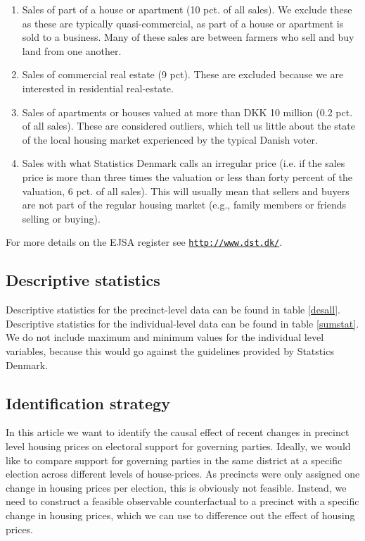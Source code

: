 \documentclass[12pt,a4paper]{article}
\begin{document}
	\begin{enumerate}
		\item Sales of part of a house or apartment (10 pct. of all sales). We exclude these as these are typically quasi-commercial, as part of a house or apartment is sold to a business. Many of these sales are between farmers who sell and buy land from one another.
		\item Sales of commercial real estate (9 pct). These are excluded because we are interested in residential real-estate.
		\item Sales of apartments or houses valued at more than DKK 10 million (0.2 pct. of all sales). These are considered outliers, which tell us little about the state of the local housing market experienced by the typical Danish voter.
		\item Sales with what Statistics Denmark calls an irregular price (i.e. if the sales price is more than three times the valuation or less than forty percent of the valuation, 6 pct. of all sales). This will usually mean that sellers and buyers are not part of the regular housing market (e.g., family members or friends selling or buying).
	\end{enumerate}
	
	For more details on the EJSA register see \texttt{\href{http://www.dst.dk/extranet/ForskningVariabellister/EJSA\%20-\%20Ejendomme\%20salgsoplysninger.html}{http://www.dst.dk/}}.

	\newpage		
			\subsection{Descriptive statistics}
			\setcounter{table}{0}
			
			Descriptive statistics for the precinct-level data can be found in table \ref{desall}. Descriptive statistics for the individual-level data can be found in table \ref{sumstat}. We do not include maximum and minimum values for the individual level variables, because this would go against the guidelines provided by Statstics Denmark.
			
			
			
			
			
			\newpage
			
			\subsection{Identification strategy}
			
			In this article we want to identify the causal effect of recent changes in precinct level housing prices on electoral support for governing parties. Ideally, we would like to compare support for governing parties in the same district at a specific election across different levels of house-prices. As precincts were only assigned one change in housing prices per election, this is obviously not feasible. Instead, we need to construct a feasible observable counterfactual to a precinct with a specific change in housing prices, which we can use to difference out the effect of housing prices.
			
\end{document}
